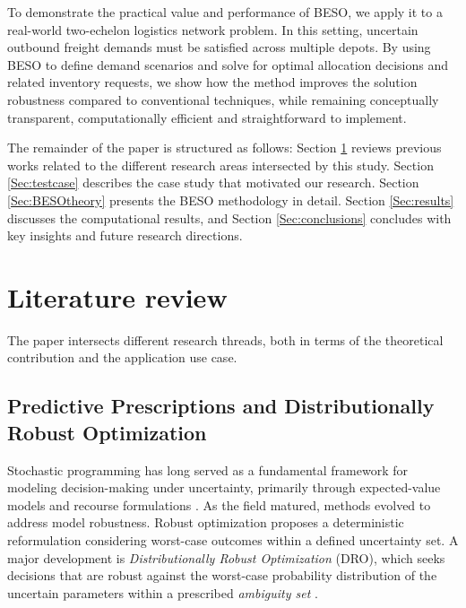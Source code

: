 \documentclass[mnsc,sglanonrev]{informs4}  %
\theoremstyle{remark}\newtheorem{remark}{Remark}
\begin{document}
To demonstrate the practical value and performance of BESO, we apply it to a real-world two-echelon logistics network problem. In this setting, uncertain outbound freight demands must be satisfied across multiple depots. By using BESO to define demand scenarios and solve for optimal allocation decisions and related inventory requests, we show how the method improves the solution robustness compared to conventional techniques, while remaining conceptually transparent, computationally efficient and straightforward to implement.

The remainder of the paper is structured as follows: Section \ref{Sec:literature} reviews previous works related to the different research areas intersected by this study. Section \ref{Sec:testcase} describes the case study that motivated our research. Section \ref{Sec:BESOtheory} presents the BESO methodology in detail. Section \ref{Sec:results} discusses the computational results, and Section \ref{Sec:conclusions} concludes with key insights and future research directions.

\section{Literature review} \label{Sec:literature}

The paper intersects different research threads, both in terms of the theoretical contribution and the application use case.

\subsection{Predictive Prescriptions and Distributionally Robust Optimization}

Stochastic programming has long served as a fundamental framework for modeling decision-making under uncertainty, primarily through expected-value models and recourse formulations \citep{D55,B55}. As the field matured, methods evolved to address model robustness. Robust optimization \citep{BS04} proposes a deterministic reformulation considering worst-case outcomes within a defined uncertainty set. A major development is {\it Distributionally Robust Optimization} (DRO), which seeks decisions that are robust against the worst-case probability distribution of the uncertain parameters within a prescribed {\it ambiguity set} \citep{DY10}.
\end{document}
